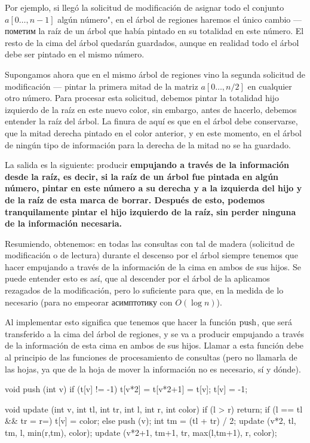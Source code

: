 Por ejemplo, si llegó la solicitud de modificación de asignar todo el conjunto $a[0 \ldots, n-1]$ algún número", en el árbol de regiones haremos el único cambio --- пометим la raíz de un árbol que había pintado en su totalidad en este número. El resto de la cima del árbol quedarán guardados, aunque en realidad todo el árbol debe ser pintado en el mismo número.

Supongamos ahora que en el mismo árbol de regiones vino la segunda solicitud de modificación --- pintar la primera mitad de la matriz $a[0 \ldots, n/2]$ en cualquier otro número. Para procesar esta solicitud, debemos pintar la totalidad hijo izquierdo de la raíz en este nuevo color, sin embargo, antes de hacerlo, debemos entender la raíz del árbol. La finura de aquí es que en el árbol debe conservarse, que la mitad derecha pintado en el color anterior, y en este momento, en el árbol de ningún tipo de información para la derecha de la mitad no se ha guardado.

La salida es la siguiente: producir \bf{empujando a través de} la información desde la raíz, es decir, si la raíz de un árbol fue pintada en algún número, pintar en este número a su derecha y a la izquierda del hijo y de la raíz de esta marca de borrar. Después de esto, podemos tranquilamente pintar el hijo izquierdo de la raíz, sin perder ninguna de la información necesaria.

Resumiendo, obtenemos: en todas las consultas con tal de madera (solicitud de modificación o de lectura) durante el descenso por el árbol siempre tenemos que hacer empujando a través de la información de la cima en ambos de sus hijos. Se puede entender esto es así, que al descender por el árbol de la aplicamos rezagados de la modificación, pero lo suficiente para que, en la medida de lo necesario (para no empeorar асимптотику con $O (\log n)$).

Al implementar esto significa que tenemos que hacer la función $\rm push$, que será transferido a la cima del árbol de regiones, y se va a producir empujando a través de la información de esta cima en ambos de sus hijos. Llamar a esta función debe al principio de las funciones de procesamiento de consultas (pero no llamarla de las hojas, ya que de la hoja de mover la información no es necesario, sí y dónde).

\code
void push (int v) {
if (t[v] != -1) {
t[v*2] = t[v*2+1] = t[v];
t[v] = -1;
}
}

void update (int v, int tl, int tr, int l, int r, int color) {
if (l > r)
return;
if (l == tl && tr = r=)
t[v] = color;
else {
push (v);
int tm = (tl + tr) / 2;
update (v*2, tl, tm, l, min(r,tm), color);
update (v*2+1, tm+1, tr, max(l,tm+1), r, color);
}
}

